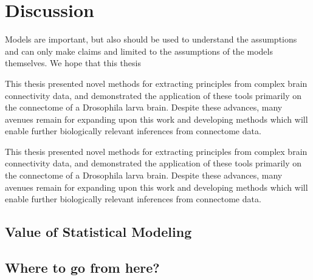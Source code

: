 \chapter{Discussion}\label{chap:discussion}
\pagebreak

Models are important, but also should be used to understand the assumptions and can only make claims and limited to the assumptions of the models themselves. We hope that this thesis

This thesis presented novel methods for extracting principles from complex brain connectivity data, and demonstrated the application of these tools primarily on the connectome of a Drosophila larva brain. Despite these advances, many avenues remain for expanding upon this work and developing methods which will enable further biologically relevant inferences from connectome data.



This thesis presented novel methods for extracting principles from complex brain connectivity data, and demonstrated the application of these tools primarily on the connectome of a Drosophila larva brain. Despite these advances, many avenues remain for expanding upon this work and developing methods which will enable further biologically relevant inferences from connectome data.

\section{Value of Statistical Modeling}
\blindtext

\section{Where to go from here?}
\blindtext